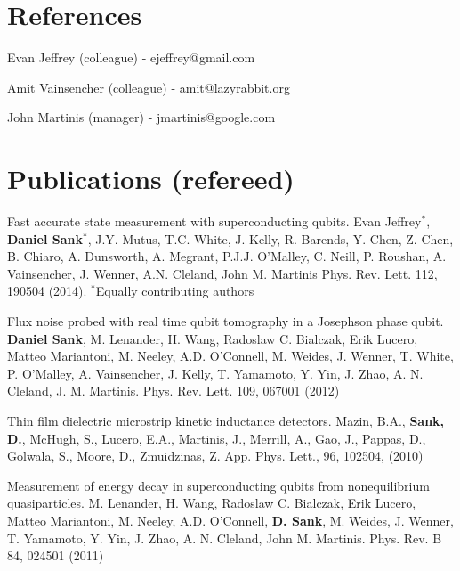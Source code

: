 \documentclass[margin=2cm,line]{res}
\newenvironment{list3}{
  \begin{list}{}{%
      \setlength{\itemsep}{0in}
      \setlength{\parsep}{0in} \setlength{\parskip}{0in}
      \setlength{\topsep}{0in} \setlength{\partopsep}{0in}
      \setlength{\leftmargin}{0.2in}}}{\end{list}}
\begin{document}
\begin{resume}
\section{\sc References}
\begin{list3}
\item Evan Jeffrey (colleague) - ejeffrey@gmail.com
\item Amit Vainsencher (colleague) - amit@lazyrabbit.org
\item John Martinis (manager) - jmartinis@google.com
\end{list3}

\pagebreak


\section{\sc Publications (refereed)}

\begin{list3}

\item Fast accurate state measurement with superconducting qubits. Evan Jeffrey$^*$, \textbf{Daniel Sank}$^*$, J.Y. Mutus, T.C. White, J. Kelly, R. Barends, Y. Chen, Z. Chen, B. Chiaro, A. Dunsworth, A. Megrant, P.J.J. O'Malley, C. Neill, P. Roushan, A. Vainsencher, J. Wenner, A.N. Cleland, John M. Martinis Phys. Rev. Lett. 112, 190504 (2014). $^*$Equally contributing authors\\

\item Flux noise probed with real time qubit tomography in a Josephson phase qubit. \textbf{Daniel Sank}, M. Lenander, H. Wang, Radoslaw C. Bialczak, Erik Lucero, Matteo Mariantoni, M. Neeley, A.D. O'Connell, M. Weides, J. Wenner, T. White, P. O'Malley, A. Vainsencher, J. Kelly, T. Yamamoto, Y. Yin, J. Zhao, A. N. Cleland, J. M. Martinis. Phys. Rev. Lett. 109, 067001 (2012) \\

\item Thin film dielectric microstrip kinetic inductance detectors. Mazin, B.A., \textbf{Sank, D.}, McHugh, S., Lucero, E.A., Martinis, J., Merrill, A., Gao, J., Pappas, D., Golwala, S., Moore, D., Zmuidzinas, Z. App. Phys. Lett., 96, 102504, (2010) \\

\item Measurement of energy decay in superconducting qubits from nonequilibrium quasiparticles. M. Lenander, H. Wang, Radoslaw C. Bialczak, Erik Lucero, Matteo Mariantoni, M. Neeley, A.D. O'Connell, \textbf{D. Sank}, M. Weides, J. Wenner, T. Yamamoto, Y. Yin, J. Zhao, A. N. Cleland, John M. Martinis. Phys. Rev. B 84, 024501 (2011)


\end{list3}
\end{resume}
\end{document}
